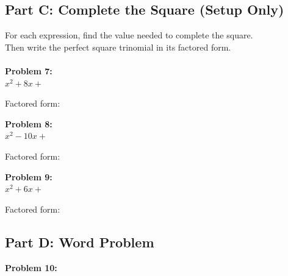 \documentclass[12pt]{article}
\begin{document}
		\subsection*{Part C: Complete the Square (Setup Only)}

			For each expression, find the value needed to complete the square.\\

			Then write the perfect square trinomial in its factored form.\\\\

			\textbf{Problem 7:}\\
            
            $x^2 + 8x + $ \underline{\hspace{1in}}

			\vspace{2cm}

			Factored form: \underline{\hspace{2in}}

			\vspace{1cm}

			\textbf{Problem 8:}\\
            
            $x^2 - 10x + $ \underline{\hspace{1in}}

			\vspace{2cm}

			Factored form: \underline{\hspace{2in}}

			\vspace{1cm}

			\textbf{Problem 9:}\\
            
            $x^2 + 6x + $ \underline{\hspace{1in}}

			\vspace{2cm}

			Factored form: \underline{\hspace{2in}}

			\newpage

		\subsection*{Part D: Word Problem}

			\textbf{Problem 10:}\\
\end{document}
